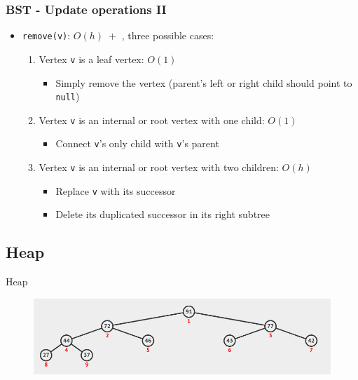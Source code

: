 \documentclass{beamer}
\begin{document}
\begin{frame}[fragile]
\frametitle{BST - Update operations II}
	\begin{itemize}
		\item \verb|remove(v)|: \color{blue} $O(h) \;+ $ \color{black}, three possible cases:
			\begin{enumerate}
				\item Vertex \verb|v| is a leaf vertex: \color{red} $O(1)$ \color{black}
						\begin{itemize}
							\item Simply remove the vertex (parent's left or right child should point to \verb|null|)
						\end{itemize}
				\item Vertex \verb|v| is an internal or root vertex with one child: \color{red} $O(1)$ \color{black}
					\begin{itemize}
						\item Connect \verb|v|'s only child with \verb|v|'s parent
					\end{itemize}
				\item Vertex \verb|v| is an internal or root vertex with two children: \color{red} $O(h)$ \color{black}
					\begin{itemize}
						\item Replace \verb|v| with its successor
						\item Delete its duplicated successor in its right subtree
					\end{itemize}
			\end{enumerate}
	\end{itemize}
\end{frame}


\subsection{Heap}

\begin{frame}{Heap}
    \begin{figure}
        \centering
        \includegraphics[scale=0.4]{imgs/2.3/heap/heap.png}
    \end{figure}
\end{frame}
\end{document}
